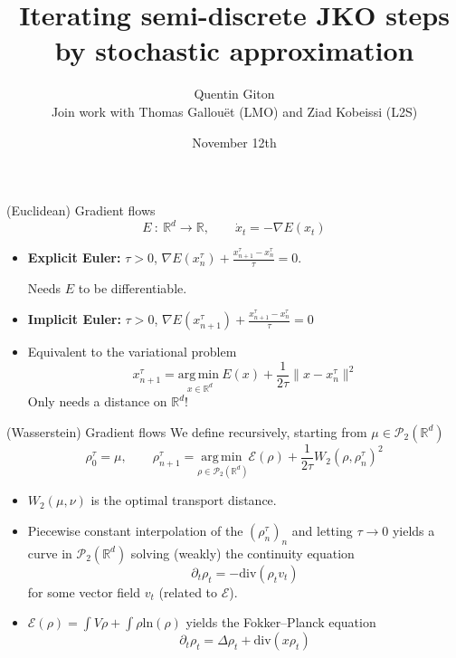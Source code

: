 \documentclass[aspectratio=169]{beamer} %
\title{
	Iterating semi-discrete JKO steps by stochastic approximation
}
\author{Quentin Giton \\
	{\small Join work with Thomas Gallouët (LMO) and Ziad Kobeissi (L2S)}}
\institute{Laboratoire de Mathématiques d'Orsay}
\date{November 12th} %
\def\argmin#1{{\underset{#1}{\mathrm{arg}\,\mathrm{min}\ }}}
\def\R{\mathbb{R}}
\renewcommand{\ln}[1]{\mathrm{ln}\left(#1\right)}
\begin{document}
	\begin{frame}
		\titlepage
	\end{frame}
	
	\begin{frame}[t]{(Euclidean) Gradient flows}
		\begin{equation*}
			E\::\:\R^d\to\R,\qquad\dot x_t = -\nabla E(x_t)
		\end{equation*}
		
		\begin{itemize}
			\item \textbf{Explicit Euler:} $\tau>0$, $\nabla E(x_n^\tau)+\frac{x_{n+1}^\tau-x_n^\tau}{\tau}=0$.
			
			Needs $E$ to be differentiable.
			\vspace{\baselineskip}
			\item \textbf{Implicit Euler:} $\tau>0$, $\nabla E(x_{n+1}^\tau)+\frac{x_{n+1}^\tau-x_n^\tau}{\tau}=0$
			\vspace{\baselineskip}
			\item Equivalent to the variational problem
			\begin{equation*}
				x_{n+1}^\tau = \argmin{x\in\R^d} E(x)+\frac{1}{2\tau}\|x-x_n^\tau\|^2
			\end{equation*}
			Only needs a distance on $\R^d$!
			
		\end{itemize}
	\end{frame}
	
	\begin{frame}[t]{(Wasserstein) Gradient flows}
		We define recursively, starting from $\mu\in\mathcal{P}_2(\R^d)$
		\begin{equation*}
			\rho_0^\tau = \mu,\qquad \rho_{n+1}^\tau = \argmin{\rho\in\mathcal P_2(\R^d)} \mathcal E(\rho)+\frac{1}{2\tau}W_2(\rho,\rho_n^\tau)^2
		\end{equation*}
		
		\begin{itemize}[<+->]
			\item $W_2(\mu,\nu)$ is the optimal transport distance.
			\vspace{.5\baselineskip}
			\item Piecewise constant interpolation of the $(\rho_n^\tau)_n$ and letting $\tau\to0$ yields a curve in $\mathcal P_2(\R^d)$ solving (weakly) the continuity equation
			\begin{equation*}
				\partial_t\rho_t = -\mathrm{div}(\rho_t v_t)
			\end{equation*}
			for some vector field $v_t$ (related to $\mathcal E$).
			\vspace{.5\baselineskip}
			\item $\mathcal E(\rho)=\int V\rho+\int\rho\ln{\rho}$ yields the Fokker--Planck equation
			\begin{equation*}
				\partial_t\rho_t=\Delta\rho_t +\mathrm{div}(x\rho_t)
			\end{equation*}
		\end{itemize}
	\end{frame}
	
\end{document}
